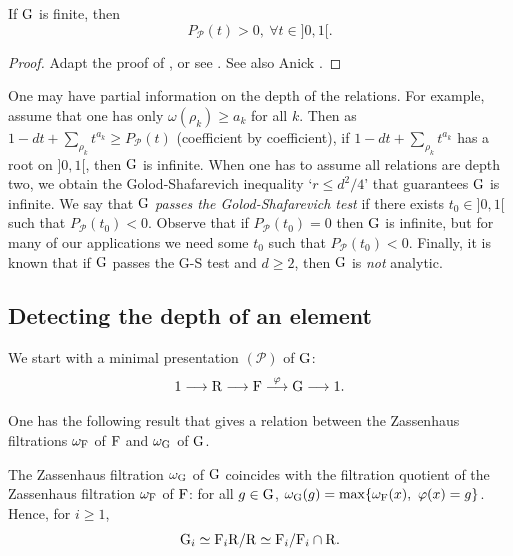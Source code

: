\documentclass[12pt,a4paper,twoside,english]{smfart}
\def\R{{\rm R}}
\def\G{{\rm G}}
\def\F{{\rm F}}
\def\PP{{\mathcal P}}
\begin{document}
 
 \begin{theo} \label{theo:GS}
 If $\G$ is finite, then $$P_\PP(t) >0, \ \forall t \in ]0,1[.$$
 \end{theo}
  
  \begin{proof}
Adapt the proof of \cite{Koch}, or see \cite{Andozski}.  See also Anick \cite{Anick}. 
  \end{proof}
 
 
 \begin{rema}
One may have partial information on the depth of the relations. For example, assume that  one has only $\omega(\rho_k) \geq a_k$ for all $k$.
Then as $1-dt+\sum_{\rho_k} t^{a_k} \geq P_\PP(t)$ (coefficient by coefficient), if $1-dt+\sum_{\rho_k} t^{a_k}$ has a root on $]0,1[$, then $\G$ is infinite. 
When one has to assume all relations  are  depth two,
we obtain the Golod-Shafarevich inequality `$r \leq d^2/4$' that guarantees  $\G$ is infinite.
We say that $\G$ {\it passes the Golod-Shafarevich test} if there exists $t_0 \in ]0,1[$ such that  $P_\PP(t_0) <0$. Observe that if $P_\PP(t_0)=0$ then $\G$ is infinite, but for many of our  applications we need some $t_0$ such that $P_\PP(t_0)<0$. 
Finally, it is known that if $\G$ passes the G-S test and $d\geq 2$, then $\G$ is {\it not} analytic.
  \end{rema}
  
  

  

\subsection{Detecting the depth of an element}

We start with a minimal presentation $(\PP)$ of $\G$:
$$1\longrightarrow \R \longrightarrow \F \stackrel{\varphi}{\longrightarrow} \G \longrightarrow 1.$$

One has the following result that gives a relation between the Zassenhaus filtrations $\omega_\F$ of $\F$ and $\omega_\G$ of   $\G$.

\begin{prop} \label{lemma:Zassenhausfiltration}
The Zassenhaus filtration $\omega_\G$ of $\G$ coincides with the  filtration quotient of the Zassenhaus filtration $\omega_\F$ of $\F$:
for all $g\in \G$,  $\omega_\G(g)=\max\{\omega_\F(x), \ \varphi(x)=g\}$.
Hence, for $i\geq 1$, $$\G_i \simeq \F_i \R/\R \simeq \F_i/\F_i\cap \R.$$
\end{prop}
\end{document}
